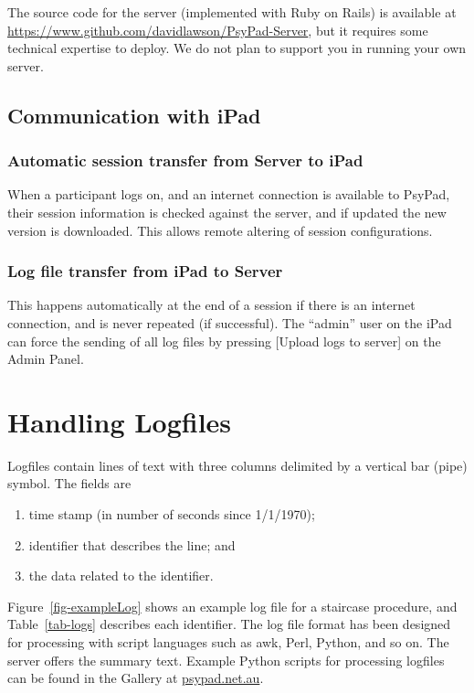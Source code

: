 \documentclass{article}
\begin{document}
The source code for the server (implemented with Ruby on Rails) is available at \url{https://www.github.com/davidlawson/PsyPad-Server}, but it requires some technical expertise to deploy. We do not plan to support you in running your own server.

\subsection{Communication with iPad}

\subsubsection{Automatic session transfer from Server to iPad}

When a participant logs on, and an internet connection is available to PsyPad, 
their session information is checked against the server, and if updated the
new version is downloaded. This allows remote altering of session configurations. 

\subsubsection{Log file transfer from iPad to Server}

This happens automatically at the end of a session if there is an internet
connection, and is never repeated (if successful).
The ``admin'' user on the iPad can force the sending of all 
log files by pressing [Upload logs to server] on the Admin Panel.

\section{Handling Logfiles}
\label{sec-logs}

Logfiles contain lines of text with three columns delimited by a vertical bar (pipe) symbol. The fields are
\begin{enumerate}
    \item time stamp (in number of seconds since 1/1/1970); 
    \item identifier that describes the line; and
    \item the data related to the identifier.
\end{enumerate}
Figure~\ref{fig-exampleLog} shows an example log file for a staircase procedure, and Table~\ref{tab-logs} describes each
identifier.
The log file format has been designed for processing with script languages such as awk, Perl, Python, and so on. The
 server offers the summary text. 
Example Python scripts for processing logfiles can be found in the Gallery at 
\url{psypad.net.au}.
\end{document}
